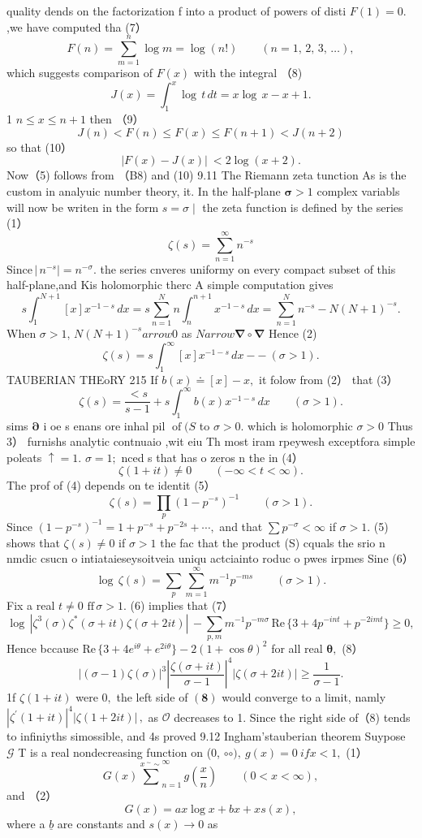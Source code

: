 quality dends on the factorization f into a product of powers of disti $F(1)=0.$ ,we have computed tha (7） $$ F(n)=\sum_{m=1}^{n}\log m=\log\left(n!\right)\qquad(n=1,\,2,\,3,\,\dots), $$ which suggests comparison of $F(x)$ with the integral （8) $$ J(x)=\int_{1}^{x}\!\log\,t\,d t=x\log\,x-x+1. $$ 1 $n\leq x\leq n+1$ then （9） $$ J(n)<F(n)\leq F(x)\leq F(n+1)<J(n+2) $$ so that (10） $$ |F(x)-J(x)|\ <2\log\left(x+2\right). $$ Now（5) follows from （B8) and (10) 9.11 The Riemann zeta tunction As is the custom in analyuic number theory, it. In the half-plane ${\boldsymbol{\sigma}}>1$ complex variabls will now be writen in the form $s=\sigma\mid$ the zeta function is defined by the series (1） $$ \zeta(s)=\sum_{n=1}^{\infty}n^{-s} $$ $\mathrm{Since}\,|\,n^{-s}|=n^{-\sigma}.$ the series cnveres uniformy on every compact subset of this half-plane,and Kis holomorphic therc A simple computation gives $$ s\int_{1}^{N+1}[x]x^{-1-s}\,d x=s\sum_{n=1}^{N}n\int_{n}^{n+1}x^{-1-s}\,d x=\sum_{n=1}^{N}n^{-s}-N(N+1)^{-s}. $$ When $\sigma>1,\,N(N+1)^{-s} arrow0$ as $N arrow\mathbf{\nabla}\circ\mathbf{\nabla}$ Hence (2) $$ \zeta(s)=s\int_{1}^{\infty}[x]x^{-1-s}\,d x-{-\ (\sigma>1)}. $$TAUBERIAN THEoRY 215 If $b(x)\doteq[x]-x,$ it folow from (2） that (3） $$ \zeta(s)={\frac{<s}{s-1}}+s\int_{1}^{\infty}b(x)x^{-1-s}\,d x\qquad(\sigma>1). $$ sims $\boldsymbol{\partial}$ i oe s enans ore inhal pil $\operatorname{of}(S$ to $\sigma>0.$ which is holomorphic $\scriptstyle\sigma>0$ Thus 3） furnishs analytic contnuaio ,wit eiu Th most iram rpeywesh exceptfora simple poleats $\textstyle{\mathsf{\uparrow}}=1.$ $\sigma=1;$ nced s that has o zeros n the in (4） $$ \zeta(1+i t)\neq0\qquad(-\infty<t<\infty). $$ The prof of (4) depends on te identit (5） $$ \zeta(s)=\prod_{p}{(1-p^{-s})^{-1}}\qquad(\sigma>1). $$ Since $(1-p^{-s})^{-1}=1+p^{-s}+p^{-2s}+\cdots,$ and that $\sum p^{-\sigma}<\infty$ if $\scriptstyle\sigma>1.$ (5) shows that $\zeta(s)\neq0$ if $\scriptstyle\sigma>1$ the fac that the product (S) cquals the srio n nmdic csucn o intiataieseysoitveia uniqu actciainto roduc o pwes irpmes Sine (6） $$ \log\,\zeta(s)=\sum_{p}\sum_{m=1}^{\infty}m^{-1}p^{-m s}\qquad(\sigma>1). $$ Fix a real $\scriptstyle t\neq0$ ${\mathrm{ff}}\,\sigma>1.$ (6) implies that (7） $$ \log\,|\zeta^{3}(\sigma)\zeta^{*}(\sigma+i t)\zeta(\sigma+2i t)|\,-\sum_{p,m}m^{-1}p^{-m\sigma}\,\mathrm{Re}\,\{3+4p^{-i n t}+p^{-2i m t}\}\geq0, $$ Hence bccause $\mathrm{Re}\,\{3+4e^{i\theta}+e^{2i\theta}\}-2(1+\cos\theta)^{2}$ for all real ${\boldsymbol{\theta}},$ (8） $$ \left|(\sigma-1){\zeta(\sigma)}\right|^{3}\left|\frac{\zeta(\sigma+i t)}{\sigma-1}\right|^{4}\left|\zeta(\sigma+2i t)\right|\geq\frac{1}{\sigma-1}. $$ 1f $\zeta(1+i t)$ were $0,$ the left side of $(\mathbf{8})$ would converge to a limit, namly $|\zeta^{\prime}(1+i t)|^{4}|\zeta(1+2i t)|\,,$ as $\scriptstyle{\mathcal{O}}$ decreases to 1. Since the right side of（8) tends to infiniyths simossible, and 4s proved 9.12 Ingham'stauberian theorem Suypose $\mathcal{G}$ T is a real nondecreasing function on (0, $\circ\circ),\ g(x)=0\ i f x<1,$ (1） $$ G(x)\stackrel{x\ ^{\sim}\sim}\sum_{n=1}^{\infty}g\left(\frac{x}{n}\right)\qquad(0<x<\infty), $$ and （2） $$ G(x)=a x\log x+b x+x s(x), $$ where a $\underline{{b}}$ are constants and $s(x)\to0$ as 